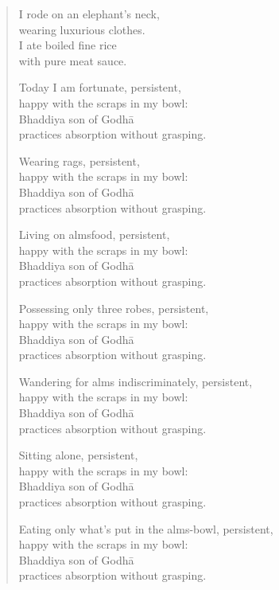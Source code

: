 \documentclass[12pt,openany]{book}%
\begin{document}
\begin{verse}%
I rode on an elephant’s neck, \\
wearing luxurious clothes. \\
I ate boiled fine rice \\
with pure meat sauce. 

Today I am fortunate, persistent, \\
happy with the scraps in my bowl: \\
Bhaddiya son of \textsanskrit{Godhā} \\
practices absorption without grasping. 

Wearing rags, persistent, \\
happy with the scraps in my bowl: \\
Bhaddiya son of \textsanskrit{Godhā} \\
practices absorption without grasping. 

Living on almsfood, persistent, \\
happy with the scraps in my bowl: \\
Bhaddiya son of \textsanskrit{Godhā} \\
practices absorption without grasping. 

Possessing only three robes, persistent, \\
happy with the scraps in my bowl: \\
Bhaddiya son of \textsanskrit{Godhā} \\
practices absorption without grasping. 

Wandering for alms indiscriminately, persistent, \\
happy with the scraps in my bowl: \\
Bhaddiya son of \textsanskrit{Godhā} \\
practices absorption without grasping. 

Sitting alone, persistent, \\
happy with the scraps in my bowl: \\
Bhaddiya son of \textsanskrit{Godhā} \\
practices absorption without grasping. 

Eating only what’s put in the alms-bowl, persistent, \\
happy with the scraps in my bowl: \\
Bhaddiya son of \textsanskrit{Godhā} \\
practices absorption without grasping. 


\end{verse}
\end{document}
